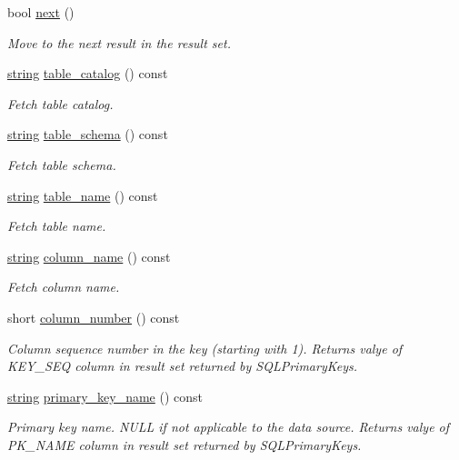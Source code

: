 \begin{DoxyCompactItemize}
\item 
bool \mbox{\hyperlink{classnanodbc_1_1catalog_1_1primary__keys_a1bf49eceb97125f61a0bde77a932e0f6}{next}} ()
\begin{DoxyCompactList}\small\item\em Move to the next result in the result set. \end{DoxyCompactList}\item 
\mbox{\hyperlink{namespacenanodbc_abfc0ece56278e590911ec8352774c212}{string}} \mbox{\hyperlink{classnanodbc_1_1catalog_1_1primary__keys_afbfca580980e280e66819c2f0a3240f6}{table\+\_\+catalog}} () const
\begin{DoxyCompactList}\small\item\em Fetch table catalog. \end{DoxyCompactList}\item 
\mbox{\hyperlink{namespacenanodbc_abfc0ece56278e590911ec8352774c212}{string}} \mbox{\hyperlink{classnanodbc_1_1catalog_1_1primary__keys_a9e3b4c7726c653c734db68fdb3a97317}{table\+\_\+schema}} () const
\begin{DoxyCompactList}\small\item\em Fetch table schema. \end{DoxyCompactList}\item 
\mbox{\hyperlink{namespacenanodbc_abfc0ece56278e590911ec8352774c212}{string}} \mbox{\hyperlink{classnanodbc_1_1catalog_1_1primary__keys_a94dd82e753c3fd03bdd946298b1b187a}{table\+\_\+name}} () const
\begin{DoxyCompactList}\small\item\em Fetch table name. \end{DoxyCompactList}\item 
\mbox{\hyperlink{namespacenanodbc_abfc0ece56278e590911ec8352774c212}{string}} \mbox{\hyperlink{classnanodbc_1_1catalog_1_1primary__keys_a27c5a18b8efc9d0632da922bf826903c}{column\+\_\+name}} () const
\begin{DoxyCompactList}\small\item\em Fetch column name. \end{DoxyCompactList}\item 
short \mbox{\hyperlink{classnanodbc_1_1catalog_1_1primary__keys_a433cd68a00686979966c4c9a0cf3efc4}{column\+\_\+number}} () const
\begin{DoxyCompactList}\small\item\em Column sequence number in the key (starting with 1). Returns valye of K\+E\+Y\+\_\+\+S\+EQ column in result set returned by S\+Q\+L\+Primary\+Keys. \end{DoxyCompactList}\item 
\mbox{\hyperlink{namespacenanodbc_abfc0ece56278e590911ec8352774c212}{string}} \mbox{\hyperlink{classnanodbc_1_1catalog_1_1primary__keys_a97c3ac806273deb1b5ecaea3eb67721f}{primary\+\_\+key\+\_\+name}} () const
\begin{DoxyCompactList}\small\item\em Primary key name. N\+U\+LL if not applicable to the data source. Returns valye of P\+K\+\_\+\+N\+A\+ME column in result set returned by S\+Q\+L\+Primary\+Keys. \end{DoxyCompactList}\end{DoxyCompactItemize}
